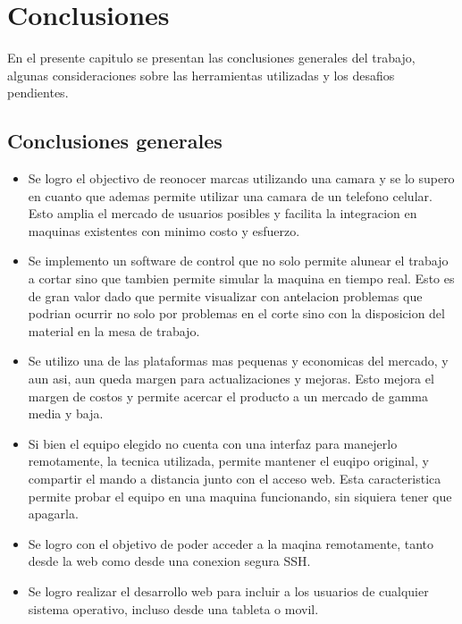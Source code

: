 \chapter{Conclusiones}
\label{Chapter5}
En el presente capitulo se presentan las conclusiones generales del trabajo, algunas consideraciones sobre las herramientas utilizadas y los desafios pendientes.

\section{Conclusiones generales }


\begin{itemize}
   \item{Se logro el objectivo de reonocer marcas utilizando una camara y se lo supero en cuanto que ademas permite utilizar una camara de un telefono celular. Esto amplia el mercado de usuarios posibles y facilita la integracion en maquinas existentes con minimo costo y esfuerzo.}

   \item{Se implemento un software de control que no solo permite alunear el trabajo a cortar sino que tambien permite simular la maquina en tiempo real. Esto es de gran valor dado que permite visualizar con antelacion problemas que podrian ocurrir no solo por problemas en el corte sino con la disposicion del material en la mesa de trabajo.}

   \item{Se utilizo una de las plataformas mas pequenas y economicas del mercado, y aun asi, aun queda margen para actualizaciones y mejoras. Esto mejora el margen de costos y permite acercar el producto a un mercado de gamma media y baja.}

   \item{Si bien el equipo elegido no cuenta con una interfaz para manejerlo remotamente, la tecnica utilizada, permite mantener el euqipo original, y compartir el mando a distancia junto con el acceso web. Esta caracteristica permite probar el equipo en una maquina funcionando, sin siquiera tener que apagarla.}

   \item{Se logro con el objetivo de poder acceder a la maqina remotamente, tanto desde la web como desde una conexion segura SSH.}

   \item{Se logro realizar el desarrollo web para incluir a los usuarios de cualquier sistema operativo, incluso desde una tableta o movil.}


\end{itemize}
